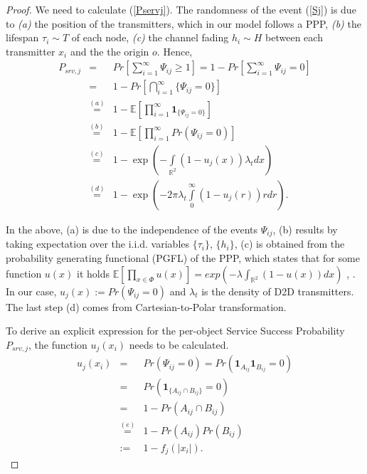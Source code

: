 \documentclass[conference]{IEEEtran}
\newcommand{\reels}{\mathbb{R}}
\begin{document}
\begin{proof}
We need to calculate (\ref{Pservj}). The randomness of the event (\ref{Sj}) is due to \emph{(a)} the position of the transmitters, which in our model follows a PPP, \emph{(b)} the lifespan $\tau_i\sim T$ of each node, \emph{(c)} the channel fading $h_i\sim H$ between each transmitter $x_i$ and the the origin $o$. Hence,
\begin{eqnarray}
\label{eqPsrv}
P_{srv,j} & = & Pr\left[\sum_{i = 1}^{\infty}\Psi_{ij}\geq 1\right] =  1-Pr\left[\sum_{i=1}^{\infty} \Psi_{ij}=0\right] \nonumber \\
& = & 1-Pr\left[\bigcap_{i=1}^{\infty} \{\Psi_{ij}=0\}\right]\nonumber \\
& \overset{(a)}{=} & 1-\mathbb{E}\left[\prod_{i=1}^{\infty}\mathbf{1}_{\{\Psi_{ij}=0\}}\right]\nonumber \\
& \overset{(b)}{=} & 1-\mathbb{E}\left[\prod_{i=1}^{\infty}Pr(\Psi_{ij}=0)\right]\nonumber \\
& \overset{(c)}{=}  & 1-\exp\left(-\int\limits_{\reels^{2}}(1-u_{j} (x))\lambda_t dx\right)\nonumber \\
& \overset{(d)}{=}  & 1-\exp\left(-2\pi \lambda_t \int\limits_{0}^{\infty} (1-u_{j} (r))r dr\right).
\end{eqnarray}

In the above, (a) is due to the independence of the events $\Psi_{ij}$, (b) results by taking expectation over the i.i.d. variables $\{\tau_i\}$, $\{h_i\}$, (c) is obtained from the probability generating functional (PGFL) of the PPP, which states that for some function $u(x)$ it holds $\mathbb{E}[\prod_{x\in\Phi}{u(x)}]=exp{(-\lambda
\int_{\reels^{2}}(1-u(x))dx)}$ \cite{HaenggiBook13}, \cite{BacBlaVol1}. In our case, $u_{j} (x):= Pr(\Psi_{ij}=0)$ and $\lambda_t$ is the density of D2D transmitters. The last step (d) comes from Cartesian-to-Polar transformation. 


To derive an explicit expression for the per-object Service Success Probability $P_{srv,j}$, the function $u_{j} (x_i)$ needs to be calculated.
 \begin{eqnarray}
 \label{eqn:15}
 u_{j} (x_i) & = & Pr(\Psi_{ij}=0) =  Pr(\mathbf{1}_{A_{ij}}\mathbf{1}_{B_{ij}}=0)\nonumber \\
 & = & Pr(\mathbf{1}_{\{A_{ij}\cap B_{ij}\}}=0)\nonumber \\
& = & 1-Pr({A_{ij}}\cap {B_{ij}})\nonumber \\
 & \overset{(e)}{=} & 1-Pr(A_{ij})Pr(B_{ij})\nonumber \\
 & := & 1-f_j(|x_i|).
\end{eqnarray}


\end{proof}
\end{document}

